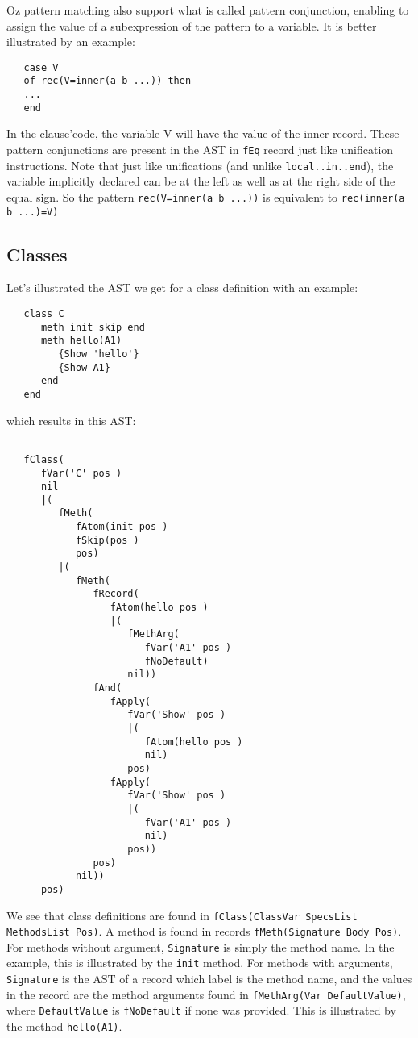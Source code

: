 \documentclass[a4paper]{memoir}
\begin{document}
Oz pattern matching also support what is called pattern conjunction, enabling to assign the value of a subexpression of the pattern to a variable. It is better illustrated by an example:
\begin{lstlisting}
   case V 
   of rec(V=inner(a b ...)) then
   ...
   end
\end{lstlisting}

In the clause'code, the variable V will have the value of the inner record.
These pattern conjunctions are present in the AST in \lstinline!fEq! record just 
like unification instructions.
Note that just like unifications (and unlike \lstinline!local..in..end!), the variable implicitly declared can be at the
left as well as at the right side of the equal sign. So the pattern
\lstinline!rec(V=inner(a b ...))! is equivalent to \lstinline!rec(inner(a b ...)=V)!


\subsection{Classes}
Let's illustrated the AST we get for a class definition with an example:

\begin{lstlisting}
   class C
      meth init skip end
      meth hello(A1)
         {Show 'hello'}
         {Show A1}
      end
   end
\end{lstlisting}
which results in this AST:
\begin{lstlisting}

   fClass(
      fVar('C' pos )
      nil
      |(
         fMeth(
            fAtom(init pos )
            fSkip(pos )
            pos)
         |(
            fMeth(
               fRecord(
                  fAtom(hello pos )
                  |(
                     fMethArg(
                        fVar('A1' pos )
                        fNoDefault)
                     nil))
               fAnd(
                  fApply(
                     fVar('Show' pos )
                     |(
                        fAtom(hello pos )
                        nil)
                     pos)
                  fApply(
                     fVar('Show' pos )
                     |(
                        fVar('A1' pos )
                        nil)
                     pos))
               pos)
            nil))
      pos)
\end{lstlisting}

We see that class definitions are found in 
\lstinline!fClass(ClassVar SpecsList MethodsList Pos)!.
A method is found in records \lstinline!fMeth(Signature Body Pos)!.
For methods without argument, \lstinline!Signature! is simply the method name.
In the example, this is illustrated by the \lstinline!init! method.
For methods with arguments, \lstinline!Signature! is the AST of a record which label is the method name, and the
values in the record are the method arguments found in 
\lstinline!fMethArg(Var DefaultValue)!, where \lstinline!DefaultValue! is
\lstinline!fNoDefault! if none was provided.
This is illustrated by the method \lstinline!hello(A1)!.
\end{document}
